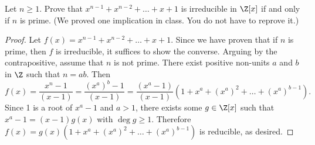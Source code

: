 \documentclass[10pt]{amsart}
\begin{document}
\begin{thm}
  Let $n \geq 1$.
  Prove that $x^{n-1} + x^{n-2} + \ldots + x + 1$ is irreducible in $\Z[x]$ if and only if $n$ is prime. 
  (We proved one implication in class.  You do not have to reprove it.)
  
  \begin{proof}
    Let $f(x) = x^{n-1} + x^{n-2} + \ldots + x + 1$.
    Since we have proven that if $n$ is prime, then $f$ is irreducible, it suffices to show the converse.
    Arguing by the contrapositive, assume that $n$ is not prime.
    There exist positive non-units $a$ and $b$ in $\Z$ such that $n = ab$.
    Then $$f(x) = \frac{x^n - 1}{(x - 1)} = \frac{(x^a)^b - 1}{(x - 1)} = \frac{(x^a - 1)}{(x - 1)}(1 + x^a + (x^a)^2 + \ldots + (x^a)^{b-1}).$$
    Since 1 is a root of $x^a - 1$ and $a > 1$, there exists some $g \in \Z[x]$ such that $x^a - 1 = (x - 1)g(x)$ with $\deg{g} \geq 1$.
    Therefore $f(x) = g(x)(1 + x^a + (x^a)^2 + \ldots + (x^a)^{b-1})$ is reducible, as desired.
  \end{proof}
\end{thm}
  
\end{document}

